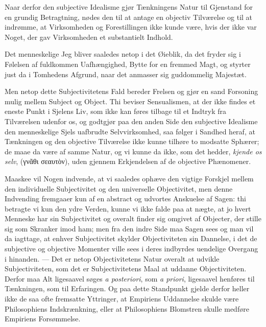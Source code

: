 \documentclass[12pt]{book}
\newcommand{\opage}[1]{\marginnote{\footnotesize\textit{[#1]}}}
\begin{document}
Naar derfor den subjective Idealisme gjør Tænkningens Natur til Gjenstand for
en grundig Betragtning, nødes den til at antage en objectiv Tilværelse og til
at indrømme, at Virksomheden og Forestillingen ikke kunde være, hvis der ikke
var Noget, der gav Virksomheden et substantielt Indhold.

Det menneskelige Jeg bliver saaledes netop i det Øieblik, da det fryder sig i
Følelsen af fuldkommen Uafhængighed, Bytte for en fremmed Magt, og styrter
just da i Tomhedens Afgrund, naar det anmasser sig guddommelig Majestæt.

Men netop dette Subjectivitetens Fald bereder Frelsen og gjør en sand
Forsoning mulig mellem Subject og Object. Thi beviser Sensualismen, at der
ikke findes et eneste Punkt i Sjelens Liv, som ikke kan føres tilbage til et
Indtryk fra Tilværelsen udenfor os, og godtgjør paa den anden Side den
subjective Idealisme den menneskelige Sjels uafbrudte Selvvirksomhed, saa
følger i Sandhed heraf, at Tænkningen og den objective Tilværelse ikke kunne
tilhøre to modsatte Sphærer; de maae da være af samme Natur, og vi kunne da
ikke, som det hedder, \emph{kjende os selv}, (γνᾶθι σεαυτὸν), uden gjennem
Erkjendelsen af de objective Phænomener.

Maaskee vil Nogen indvende, at vi saaledes ophæve den vigtige Forskjel mellem
den individuelle Subjectivitet og den universelle Objectivitet, men denne
Indvending fremgaaer kun af en abstract og udvortes Anskuelse af Sagen: thi
betragte
\opage{5} vi kun den ydre Verden, kunne vi ikke falde paa at nægte, at jo hvert Menneske
har sin Subjectivitet og overalt finder sig omgivet af Objecter, der stille
sig som Skranker imod ham; men fra den indre Side maa Sagen sees og man vil da
iagttage, at enhver Subjectivitet skylder Objectiviteten sin Dannelse, i det
de subjective og objective Momenter ville sees i deres indbyrdes uendelige
Overgang i hinanden. --- Det er netop Objectivitetens Natur overalt at udvikle
Subjectiviteten, som det er Subjectivitetens Maal at uddanne Objectiviteten.
Derfor maa Alt ligesaavel søges \textit{a posteriori}, som \textit{a priori},
ligesaavel henføres til Tænkningen, som til Erfaringen. Og paa dette
Standpunkt gjelde derfor heller ikke de saa ofte fremsatte Yttringer, at
Empiriens Uddannelse skulde være Philosophiens Indskrænkning, eller at
Philosophiens Blomstren skulle medføre Empiriens Forsømmelse.
\end{document}
